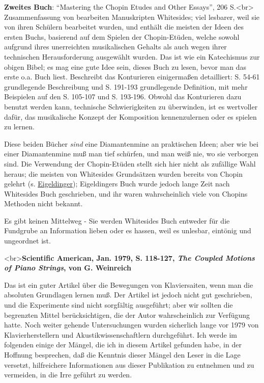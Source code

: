 \textbf{Zweites Buch}: \enquote{Mastering the Chopin Etudes and Other Essays}, 206 S.<br>
Zusammenfassung von bearbeiten Manuskripten Whitesides; viel lesbarer, weil sie von ihren Schülern bearbeitet wurden, und enthält die meisten der Ideen des ersten Buchs, basierend auf dem Spielen der Chopin-Etüden, welche sowohl aufgrund ihres unerreichten musikalischen Gehalts als auch wegen ihrer technischen Herausforderung ausgewählt wurden.
Das ist wie ein Katechismus zur obigen Bibel; es mag eine gute Idee sein, dieses Buch zu lesen, bevor man das erste o.a. Buch liest.
Beschreibt das Konturieren einigermaßen detailliert: S. 54-61 grundlegende Beschreibung und S. 191-193 grundlegende Definition, mit mehr Beispielen auf den S. 105-107 und S. 193-196.
Obwohl das Konturieren dazu benutzt werden kann, technische Schwierigkeiten zu überwinden, ist es wertvoller dafür, das musikalische Konzept der Komposition kennenzulernen oder es spielen zu lernen.

Diese beiden Bücher \textit{sind} eine Diamantenmine an praktischen Ideen; aber wie bei einer Diamantenmine muß man tief schürfen, und man weiß nie, wo sie verborgen sind.
Die Verwendung der Chopin-Etüden stellt sich hier nicht als zufällige Wahl heraus; die meisten von Whitesides Grundsätzen wurden bereits von Chopin gelehrt (s. \hyperlink{Eigeldinger}{Eigeldinger}); Eigeldingers Buch wurde jedoch lange Zeit nach Whitesides Buch geschrieben, und ihr waren wahrscheinlich viele von Chopins Methoden nicht bekannt.

Es gibt keinen Mittelweg - Sie werden Whitesides Buch entweder für die Fundgrube an Information lieben oder es hassen, weil es unlesbar, eintönig und ungeordnet ist.
 

\hypertarget{American}{}

<br>\textbf{Scientific American, Jan. 1979, S. 118-127, \textit{The Coupled Motions of Piano Strings}, von G. Weinreich}

Das ist ein guter Artikel über die Bewegungen von Klaviersaiten, wenn man die absoluten Grundlagen lernen muß.
Der Artikel ist jedoch nicht gut geschrieben, und die Experimente sind nicht sorgfältig ausgeführt; aber wir sollten die begrenzten Mittel berücksichtigen, die der Autor wahrscheinlich zur Verfügung hatte.
Noch weiter gehende Untersuchungen wurden sicherlich lange vor 1979 von Klavierherstellern und Akustikwissenschaftlern durchgeführt.
Ich werde im folgenden einige der Mängel, die ich in diesem Artikel gefunden habe, in der Hoffnung besprechen, daß die Kenntnis dieser Mängel den Leser in die Lage versetzt, hilfreichere Informationen aus dieser Publikation zu entnehmen und zu vermeiden, in die Irre geführt zu werden.

